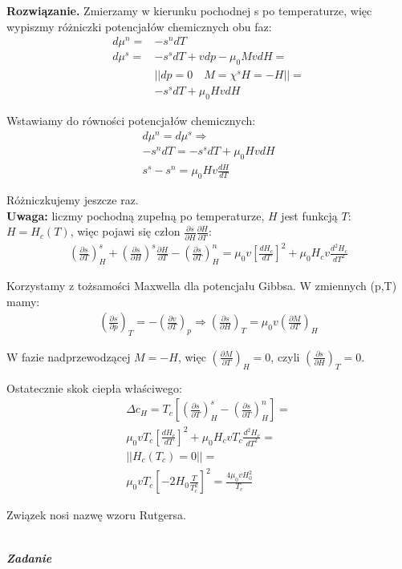 \documentclass[11pt,a4paper]{article}
\newcounter{zadanie}\newcommand{\zadanie}[1][]{\addtocounter{zadanie}{1} ~\\ {\bf \emph{Zadanie \arabic{zadanie} #1 }} \\}
\newenvironment{solution}{\vspace{1cm} \par\textbf{Rozwiązanie.} \vspace{1cm}}{}
\begin{document}
\begin{solution}
Zmierzamy w kierunku pochodnej s po temperaturze, 
więc wypiszmy różniczki potencjałów chemicznych obu faz:
\begin{align*}
d\mu^{n} =& -s^{n} dT \\
d\mu^{s} =& -s^{s} dT + v dp - \mu_0 M v dH = \\
          & || dp = 0 \quad M = \chi^{s} H = -H || = \\
& -s^{s} dT + \mu_0 H v dH
\end{align*}

Wstawiamy do równości potencjałów chemicznych:
\begin{align*}
d\mu^{n} = d\mu^{s} \Rightarrow \\
-s^{n} dT = -s^{s} dT + \mu_0 H v dH \\
s^{s} - s^{n} = \mu_0 H v \frac{dH}{dT} 
\end{align*}

Różniczkujemy jeszcze raz. \\
{\bf Uwaga:} liczmy pochodną zupełną po temperaturze, $H$ jest funkcją $T$:
 $H = H_c(T)$, więc pojawi się człon 
 $\frac{\partial s}{\partial H} \frac{\partial H}{\partial T}$:
\begin{align*}
\left( \frac{\partial s}{\partial T} \right)_H^{s} +
\left( \frac{\partial s}{\partial H} \right)^{s}\frac{\partial H}{\partial T}
- 
\left( \frac{\partial s}{\partial T} \right)_H^{n} = 
\mu_0 v \left[ \frac{dH_c}{dT} \right]^2 + \mu_0 H_c v \frac{d^2 H_c}{dT^2}
\end{align*}

Korzystamy z tożsamości Maxwella dla potencjału Gibbsa.
W zmiennych (p,T) mamy:
\begin{align*}
\left( \frac{\partial s}{\partial p} \right)_T = 
-\left( \frac{\partial v}{\partial T} \right)_p \Rightarrow
\left( \frac{\partial s}{\partial H} \right)_T = 
\mu_0 v \left( \frac{\partial M}{\partial T} \right)_H
\end{align*}

W fazie nadprzewodzącej $M = -H$, więc 
$\left( \frac{\partial M}{\partial T} \right)_H = 0$, czyli 
$\left( \frac{\partial s}{\partial H} \right)_T = 0$. 

Ostatecznie skok ciepła właściwego:
\begin{align*}
\Delta c_H = T_{c} \left[
\left( \frac{\partial s}{\partial T} \right)_H^{s} - 
\left( \frac{\partial s}{\partial T} \right)_H^{n} \right] = \\
\mu_0 v T_c \left[ \frac{dH_c}{dT} \right]^2 + \mu_0 H_c v T_c \frac{d^2 H_c}{dT^2} = \\
|| H_c(T_c) = 0 || = \\
\mu_0 v T_c \left[ -2H_0 \frac{T}{T_c^2} \right]^2 = 
\frac{4\mu_0 v H_0^2}{T_c}
\end{align*}

Związek nosi nazwę wzoru Rutgersa.


\newpage
\end{solution}
\zadanie[]
\end{document}
